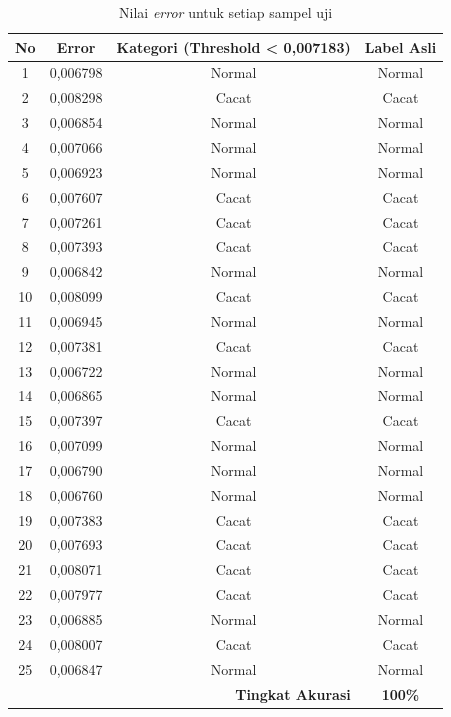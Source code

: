 \begin{table}[H]
  \centering
  \caption{Nilai \textit{error} untuk setiap sampel uji}
  \label{tab:error-samples-web}
  \begin{tabular}{cccc}
    \toprule
    \textbf{No} & \textbf{Error} & \textbf{Kategori
      (Threshold <
    0,007183)} & \textbf{Label Asli} \\
    \midrule
    1  & 0,006798 & Normal & Normal \\
    2  & 0,008298 & Cacat & Cacat \\
    3  & 0,006854 & Normal & Normal \\
    4  & 0,007066 & Normal & Normal \\
    5  & 0,006923 & Normal & Normal \\
    6  & 0,007607 & Cacat & Cacat \\
    7  & 0,007261 & Cacat & Cacat \\
    8  & 0,007393 & Cacat & Cacat \\
    9  & 0,006842 & Normal & Normal \\
    10 & 0,008099 & Cacat & Cacat \\
    11 & 0,006945 & Normal & Normal \\
    12 & 0,007381 & Cacat & Cacat \\
    13 & 0,006722 & Normal & Normal \\
    14 & 0,006865 & Normal & Normal \\
    15 & 0,007397 & Cacat & Cacat \\
    16 & 0,007099 & Normal & Normal \\
    17 & 0,006790 & Normal & Normal \\
    18 & 0,006760 & Normal & Normal \\
    19 & 0,007383 & Cacat & Cacat \\
    20 & 0,007693 & Cacat & Cacat \\
    21 & 0,008071 & Cacat & Cacat \\
    22 & 0,007977 & Cacat & Cacat \\
    23 & 0,006885 & Normal & Normal \\
    24 & 0,008007 & Cacat & Cacat \\
    25 & 0,006847 & Normal & Normal \\
    \midrule
    \multicolumn{3}{r}{\textbf{Tingkat Akurasi}} & \textbf{100\%} \\
    \bottomrule
  \end{tabular}
\end{table}

